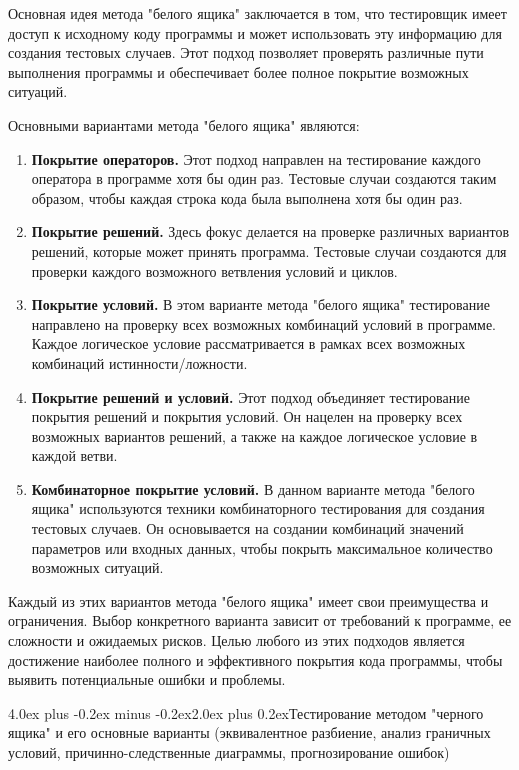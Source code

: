 \documentclass[12pt, a4paper]{book}%
\makeatletter
\renewcommand{\section}{\@startsection{section}{1}{1pt}%
{4.0ex plus -0.2ex minus -0.2ex}{2.0ex plus 0.2ex}{\centering\bf}}%
\makeatother
\begin{document}
{Основная идея метода "белого ящика" заключается в том, что тестировщик имеет доступ к исходному коду программы и может использовать эту информацию для создания тестовых случаев. Этот подход позволяет проверять различные пути выполнения программы и обеспечивает более полное покрытие возможных ситуаций.

Основными вариантами метода "белого ящика" являются:

\begin{enumerate}
\item {\bf Покрытие операторов.}
Этот подход направлен на тестирование каждого оператора в программе хотя бы один раз. Тестовые случаи создаются таким образом, чтобы каждая строка кода была выполнена хотя бы один раз.

\item {\bf Покрытие решений.}
Здесь фокус делается на проверке различных вариантов решений, которые может принять программа. Тестовые случаи создаются для проверки каждого возможного ветвления условий и циклов.

\item {\bf Покрытие условий.}
В этом варианте метода "белого ящика" тестирование направлено на проверку всех возможных комбинаций условий в программе. Каждое логическое условие рассматривается в рамках всех возможных комбинаций истинности/ложности.

\item {\bf Покрытие решений и условий.}
Этот подход объединяет тестирование покрытия решений и покрытия условий. Он нацелен на проверку всех возможных вариантов решений, а также на каждое логическое условие в каждой ветви.

\item {\bf Комбинаторное покрытие условий.}
В данном варианте метода "белого ящика" используются техники комбинаторного тестирования для создания тестовых случаев. Он основывается на создании комбинаций значений параметров или входных данных, чтобы покрыть максимальное количество возможных ситуаций.

\end{enumerate}

Каждый из этих вариантов метода "белого ящика" имеет свои преимущества и ограничения. Выбор конкретного варианта зависит от требований к программе, ее сложности и ожидаемых рисков. Целью любого из этих подходов является достижение наиболее полного и эффективного покрытия кода программы, чтобы выявить потенциальные ошибки и проблемы.

\section{Тестирование методом "черного ящика" и его основные варианты (эквивалентное разбиение, анализ граничных условий, причинно-следственные диаграммы, прогнозирование ошибок)}


}
\end{document}
